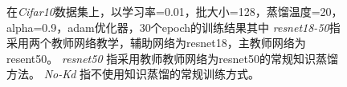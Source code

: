 \begin{figure}[t]
	\centering
	\caption{在\emph{Cifar10}数据集上，以学习率=0.01，批大小=128，蒸馏温度=20，alpha=0.9，adam优化器，30个epoch的训练结果其中 \emph{resnet18-50}指采用两个教师网络教学，辅助网络为resnet18，主教师网络为resent50。 \emph{resnet50} 指采用教师教师网络为resnet50的常规知识蒸馏方法。 \emph{No-Kd} 指不使用知识蒸馏的常规训练方式。}
	\label{kd_cmp}
\end{figure}



